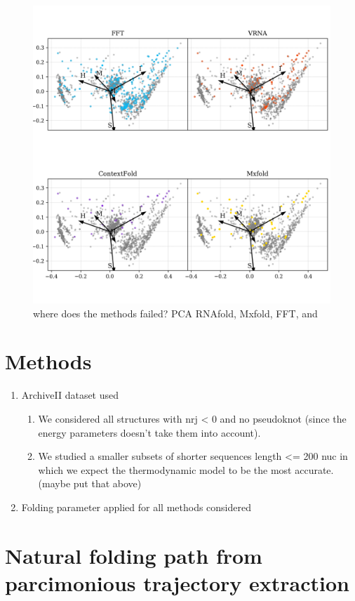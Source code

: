 \documentclass[a4paper,12pt]{article}
\begin{document}
{{\begin{figure}[htbp]
\centering
\includegraphics[width=.9\linewidth]{img/comp_fails.png}
\caption{where does the methods failed? PCA RNAfold, Mxfold, FFT, and}
\end{figure}

\section{Methods}
\label{sec:orgcb4cd39}
\begin{enumerate}
\item ArchiveII dataset used
\begin{enumerate}
\item We considered all structures with nrj < 0 and no pseudoknot (since the
energy parameters doesn't take them into account).
\item We studied a smaller subsets of shorter sequences length <= 200 nuc in
which we expect the thermodynamic model to be the most accurate. (maybe
put that above)
\end{enumerate}
\item Folding parameter applied for all methods considered
\end{enumerate}

\clearpage
\section{Natural folding path from parcimonious trajectory extraction}
\label{sec:org89ad4a0}
\clearpage
}}
\end{document}
